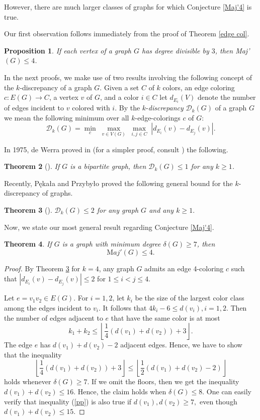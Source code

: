 \documentclass[11pt]{article}
\newtheorem{theorem}{Theorem}
\newtheorem{proposition}[theorem]{Proposition}
\begin{document}
However, there are much larger classes of graphs for which Conjecture \ref{Maj'4} is true. 

Our first observation follows immediately from the proof of Theorem \ref{edge col}.
\begin{proposition}\label{razy 3}
If each vertex of a graph $G$ has degree divisible by $3$, then Maj'$(G)\le 4$.
\end{proposition}

In the next proofs, we make use of two results involving the following concept of the $k$-discrepancy of a graph $G$. Given a set $C$ of $k$ colors, an edge coloring $c:E(G)\rightarrow C$, a vertex $v$ of $G$, and a color $i\in C$ let $d_{E_i}(V)$ denote the number of edges incident to $v$ colored with $i$. By the $k$-{\it discrepancy} ${\mathcal D}_k(G)$ of a graph $G$ we mean the following minimum over all $k$-edge-colorings $c$ of $G$:
$${\mathcal D}_k(G)=\min_c\; \max_{v\in V(G)}\; \max_{i,j\in C}\;|d_{E_i}(v)-d_{E_j}(v)|.$$

In 1975, de Werra proved in \cite{deW75} (for a simpler proof, consult \cite{HiStSl98}) the following. 
\begin{theorem} [\cite{deW75}]\label{de}
If $G$ is a bipartite graph, then  ${\mathcal D}_k(G)\le 1$ for any $k\ge 1$.  
\end{theorem}

Recently, P\k{e}ka{\l}a and Przyby{\l}o  \cite{PePr25} proved the following general bound for the $k$-discrepancy of graphs.
\begin{theorem}[\cite{PePr25}]\label{PP}
${\mathcal D}_k(G)\le 2$ for any graph $G$ and any $k\ge 1.$
\end{theorem}

Now, we state our most general result regarding Conjecture \ref{Maj'4}. 
\begin{theorem}\label{delta7}
If $G$ is a graph with minimum degree $\delta(G)\ge 7$, then $${\mathrm Maj'}(G)\le 4.$$
\end{theorem}
\begin{proof}
By Theorem \ref{PP} for $k=4$, any graph $G$ admits an edge 4-coloring $c$ such that $|d_{E_i}(v)-d_{E_j}(v)|\le 2$ for $1\le i<j\le 4.$

Let $e=v_1v_2\in E(G)$. For $i=1,2$, let $k_i$ be the size of the largest color class among the edges incident to $v_i$. It follows that $4k_i-6\le d(v_i), i=1,2.$ Then the number of edges adjacent to $e$ that have the same color is at most 
$$k_1+k_2\le \left\lfloor\frac14(d(v_1)+d(v_2))+3\right\rfloor.$$  The edge $e$ has $d(v_1)+d(v_2)-2$ adjacent edges. Hence, we have to show that the inequality  
\begin{equation}\label{pp}
\left\lfloor\frac14(d(v_1)+d(v_2))+3\right\rfloor\le \left\lfloor\frac12(d(v_1)+d(v_2)-2)\right\rfloor
\end{equation}
holds whenever $\delta(G)\ge 7.$ If we omit the floors, then we get the inequality $d(v_1)+d(v_2)\le 16.$ Hence, the claim holds when $\delta(G)\le 8$. One can easily verify that inequality (\ref{pp}) is also true if $d(v_1), d(v_2)\ge 7,$ even though $d(v_1)+d(v_2)\le 15.$
\end{proof}
\end{document}
